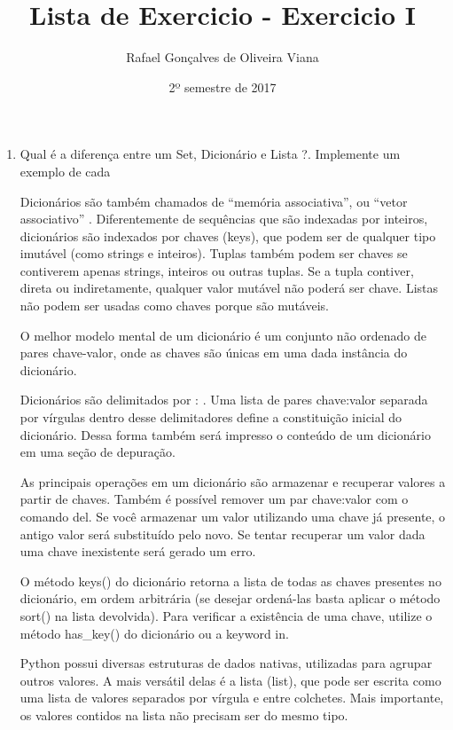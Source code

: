 \documentclass[12pt]{article}
\title{Lista de Exercicio  - Exercicio I }
\author{Rafael Gonçalves de  Oliveira Viana}
\date{2º semestre de 2017}
\begin{document}
\maketitle

\begin{enumerate}
\item Qual é a diferença entre um Set, Dicionário e Lista ?. Implemente um exemplo de cada

Dicionários são também chamados de ``memória associativa'', ou ``vetor associativo'' . Diferentemente de sequências que são indexadas por inteiros, dicionários são indexados por chaves (keys), que podem ser de qualquer tipo imutável (como strings e inteiros). Tuplas também podem ser chaves se contiverem apenas strings, inteiros ou outras tuplas. Se a tupla contiver, direta ou indiretamente, qualquer valor mutável não poderá ser chave. Listas não podem ser usadas como chaves porque são mutáveis.

O melhor modelo mental de um dicionário é um conjunto não ordenado de pares chave-valor, onde as chaves são únicas em uma dada instância do dicionário.

Dicionários são delimitados por : {}. Uma lista de pares chave:valor separada por vírgulas dentro desse delimitadores define a constituição inicial do dicionário. Dessa forma também será impresso o conteúdo de um dicionário em uma seção de depuração.

As principais operações em um dicionário são armazenar e recuperar valores a partir de chaves. Também é possível remover um par chave:valor com o comando del. Se você armazenar um valor utilizando uma chave já presente, o antigo valor será substituído pelo novo. Se tentar recuperar um valor dada uma chave inexistente será gerado um erro.

O método keys() do dicionário retorna a lista de todas as chaves presentes no dicionário, em ordem arbitrária (se desejar ordená-las basta aplicar o método sort() na lista devolvida). Para verificar a existência de uma chave, utilize o método has_key() do dicionário ou a keyword in.


Python possui diversas estruturas de dados nativas, utilizadas para agrupar outros valores. A mais versátil delas é a lista (list), que pode ser escrita como uma lista de valores separados por vírgula e entre colchetes. Mais importante, os valores contidos na lista não precisam ser do mesmo tipo.

\end{enumerate}
\end{document}
